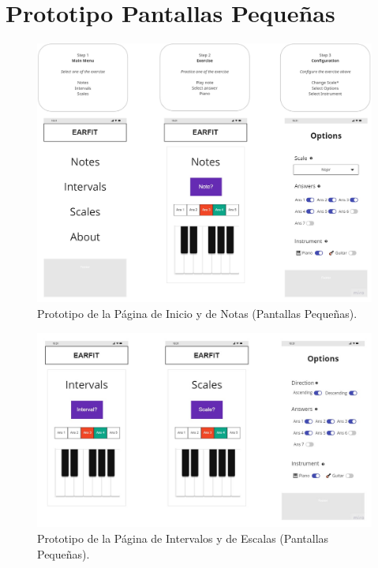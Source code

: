 \documentclass[12pt,twoside,titlepage]{report}
\begin{document}
{\section{Prototipo Pantallas Pequeñas}

\begin{figure}[H]
    \centering
    \includegraphics[scale=0.2]{Design Thinking/Prototipo/Small/Prototipo}
    \caption{Prototipo de la Página de Inicio y de Notas (Pantallas Pequeñas).}
    \label{fig:Prototipo1}
\end{figure}

\begin{figure}[H]
    \centering
    \includegraphics[scale=0.3]{Design Thinking/Prototipo/Small/Prototipo2}
    \caption{Prototipo de la Página de Intervalos y de Escalas (Pantallas Pequeñas).}
    \label{fig:Prototipo2}
\end{figure}

}
\end{document}
